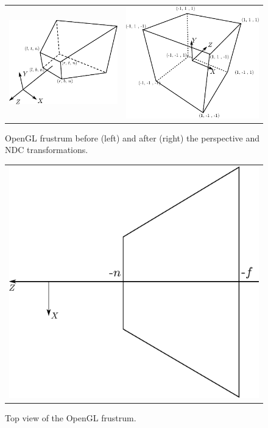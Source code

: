 \begin{figure}[t]
\centering
 \begin{tabular}{cc}
  \includegraphics[width=0.45\columnwidth]{./img/ch-camera/openglcam01}&
  \includegraphics[width=0.45\columnwidth]{./img/ch-camera/openglcam02}
 \end{tabular}
 \caption{OpenGL frustrum before (left) and after (right) the perspective and NDC transformations.}
 \label{fig:perspective}
\end{figure}

\begin{figure}[t]
\centering
 \begin{tabular}{c}
  \includegraphics[width=0.78\columnwidth]{./img/ch-camera/openglcam03}
 \end{tabular}
 \caption{Top view of the OpenGL frustrum.}
 \label{fig:frustrumTop}
\end{figure}
